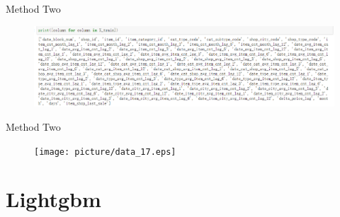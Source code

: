 \documentclass[
 size=14pt,
 paper=smartboard,  %
 mode=present, 		%
 display=slides, 	%
 style=tuliplab,  	%
 pauseslide,
 fleqn,leqno]{powerdot}
\begin{document}
\begin{slide}[toc=,bm=]{Method Two}
  \begin{figure}
    \includegraphics[scale=0.5]{picture/data_16.eps}
  \end{figure}
\end{slide}

\begin{slide}[toc=,bm=]{Method Two}
  \begin{figure}
    \texttt{[image: picture/data\_17.eps]}
  \end{figure}
\end{slide}

\section{Lightgbm}
\end{document}
